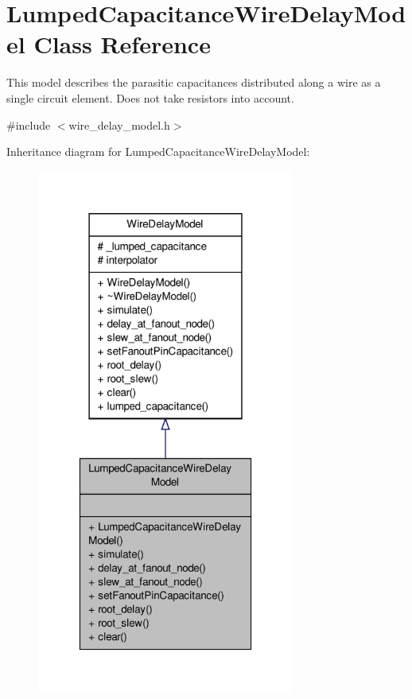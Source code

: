 \hypertarget{classLumpedCapacitanceWireDelayModel}{\section{Lumped\-Capacitance\-Wire\-Delay\-Model Class Reference}
\label{classLumpedCapacitanceWireDelayModel}
}


This model describes the parasitic capacitances distributed along a wire as a single circuit element. Does not take resistors into account.  




{\ttfamily \#include $<$wire\-\_\-delay\-\_\-model.\-h$>$}



Inheritance diagram for Lumped\-Capacitance\-Wire\-Delay\-Model\-:\nopagebreak
\begin{figure}[H]
\begin{center}
\leavevmode
\includegraphics[width=240pt]{classLumpedCapacitanceWireDelayModel__inherit__graph}
\end{center}
\end{figure}



